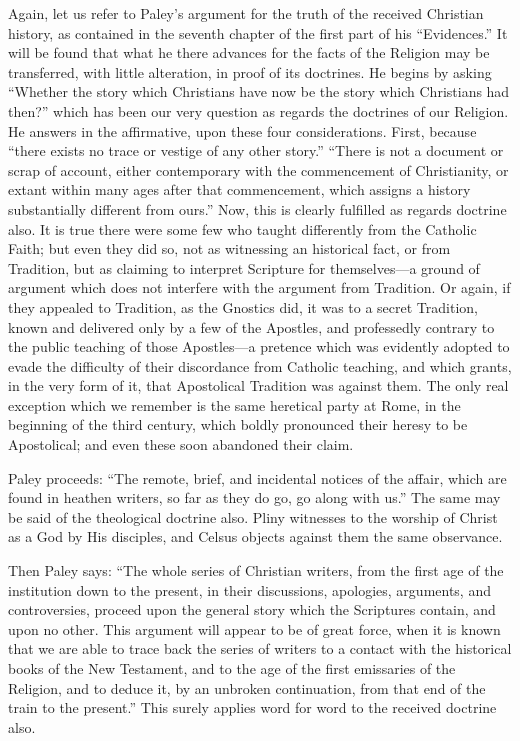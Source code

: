 Again, let us refer to Paley's argument for the
truth of the received Christian history, as contained in the seventh
chapter of the first part of his ``Evidences.'' It will be found
that what he there advances for the facts of the Religion may be
transferred, with little alteration, in proof of its doctrines. He
begins by asking ``Whether the story which Christians have now be the
story which Christians had then?'' which has been our very question as
regards the doctrines of our Religion. He answers in the affirmative,
upon these four considerations. First, because ``there exists no trace
or vestige of any other story.'' ``There is not a document or scrap of
account, either contemporary with the commencement of Christianity, or
extant within many ages after that commencement, which assigns a
history substantially different from ours.'' Now, this is clearly
fulfilled as regards doctrine also. It is true there were some few who
taught differently from the Catholic Faith; but even they did so, not
as witnessing an historical fact, or from Tradition, but as claiming
to interpret Scripture for themselves—a ground of argument which
does not interfere with the argument from Tradition. Or again, if they
appealed to Tradition, as the Gnostics did, it was to a secret
Tradition, known and delivered only by a few of the Apostles, and
professedly contrary to the public teaching of those Apostles—a
pretence which was evidently adopted to evade the difficulty of their
discordance from Catholic teaching, and which grants, in the very form
of it, that Apostolical Tradition was against them. The only real
exception which we remember is the same heretical party at Rome, in
the beginning of the third century, which boldly pronounced their
heresy to be Apostolical; and even these soon abandoned their claim.

Paley proceeds: ``The remote, brief, and
incidental notices of the affair, which are found in heathen writers,
so far as they do go, go along with us.'' The same may be said of
the theological doctrine also. Pliny witnesses to the worship of
Christ as a God by His disciples, and Celsus objects against them the
same observance.

Then Paley says: ``The whole series of Christian
writers, from the first age of the institution down to the present, in
their discussions, apologies, arguments, and controversies, proceed
upon the general story which the Scriptures contain, and upon no
other. This argument will appear to be of great force, when it is
known that we are able to trace back the series of writers to a
contact with the historical books of the New Testament, and to the age
of the first emissaries of the Religion, and to deduce it, by an
unbroken continuation, from that end of the train to the present.''
This surely applies word for word to the received doctrine also.


